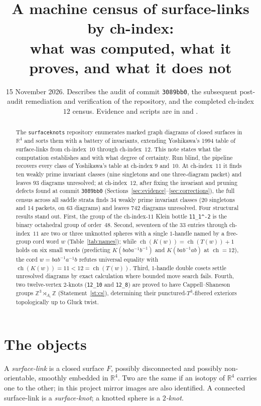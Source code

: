 \documentclass[11pt]{amsart}
\title[A machine census of surface-links by ch-index]{A machine census of surface-links by ch-index:\\
what was computed, what it proves, and what it does not}
\date{15 November 2026. Describes the audit of commit \texttt{3089bb0}, the subsequent post-audit remediation
and verification of the repository, and the completed ch-index $12$ census. Evidence and scripts are in
\file{AUDIT.md} and \file{audit\_scripts/}.}
\newcommand{\ch}{\operatorname{ch}}
\newcommand{\Z}{\mathbb{Z}}
\newcommand{\lab}[1]{\texttt{#1}}
\newcommand{\inv}{^{-1}}
\theoremstyle{plain}
\theoremstyle{remark}
\begin{document}
\begin{abstract}
The \texttt{surfaceknots} repository enumerates marked graph diagrams of closed surfaces in $\mathbb{R}^4$
and sorts them with a battery of invariants, extending Yoshikawa's 1994 table of surface-links from
ch-index~$10$ through ch-index~$12$. This note states what the computation establishes and with what degree
of certainty. Run blind, the pipeline recovers every class of Yoshikawa's table at ch-index $9$ and~$10$.
At ch-index~$11$ it finds ten weakly prime invariant classes (nine singletons and one three-diagram packet)
and leaves $93$ diagrams unresolved; at ch-index~$12$, after fixing the invariant and pruning defects found
at commit \texttt{3089bb0} (Sections~\ref{sec:evidence}--\ref{sec:corrections}), the full census across all
saddle strata finds $34$ weakly prime invariant classes ($20$ singletons and $14$ packets, on $63$ diagrams)
and leaves $742$ diagrams unresolved. Four structural results stand out. First, the group of the
ch-index-$11$ Klein bottle \lab{11\_1\^{}-2} is the binary octahedral group of order~$48$. Second, seventeen
of the $33$ entries through ch-index~$11$ are two or three unknotted spheres with a single $1$-handle named
by a free-group cord word $w$ (Table~\ref{tab:names}); while $\ch(K(w))=\ch(T(w))+1$ holds on six small words
(predicting $K(baba\inv b\inv)$ and $K(bab\inv ab)$ at $\ch=12$), the cord $w=bab\inv a\inv b$ refutes
universal equality with $\ch(K(w))=11<12=\ch(T(w))$. Third, $1$-handle double cosets settle unresolved
diagrams by exact calculation where bounded move search fails. Fourth, two twelve-vertex $2$-knots
(\lab{12\_10} and \lab{12\_8}) are proved to have Cappell--Shaneson groups $\Z^3\rtimes_{A_i}\Z$
(Statement~\ref{st:cs}), determining their punctured-$T^3$-fibered exteriors topologically up to Gluck twist.
\end{abstract}

\maketitle

\section{The objects}

A \emph{surface-link} is a closed surface $F$, possibly disconnected and possibly non-orientable, smoothly
embedded in $\mathbb{R}^4$. Two are the same if an isotopy of $\mathbb{R}^4$ carries one to the other; in
this project mirror images are also identified. A connected surface-link is a \emph{surface-knot}; a
knotted sphere is a \emph{$2$-knot}.
\end{document}
